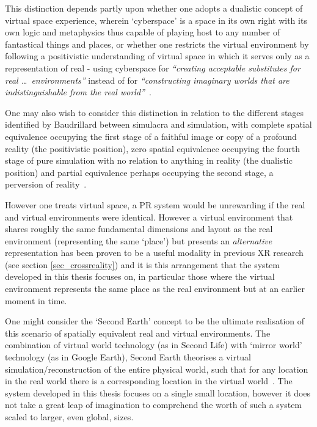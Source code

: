 This distinction depends partly upon whether one adopts a dualistic concept of virtual space experience, wherein `cyberspace' is a space in its own right with its own logic and metaphysics thus capable of playing host to any number of fantastical things and places, or whether one restricts the virtual environment by following a positivistic understanding of virtual space in which it serves only as a representation of real - using cyberspace for \textit{``creating acceptable substitutes for real \ldots\ environments''} instead of for \textit{``constructing imaginary worlds that are indistinguishable from the real world''}~\cite{Qvortrup2002}.

One may also wish to consider this distinction in relation to the different stages identified by Baudrillard between simulacra and simulation, with complete spatial equivalence occupying the first stage of a faithful image or copy of a profound reality (the positivistic position), zero spatial equivalence occupying the fourth stage of pure simulation with no relation to anything in reality (the dualistic position) and partial equivalence perhaps occupying the second stage, a perversion of reality~\cite{Baudrillard1994}.


However one treats virtual space, a PR system would be unrewarding if the real and virtual environments were identical\turklevrfootnote{}. However a virtual environment that shares roughly the same fundamental dimensions and layout as the real environment (representing the same `place') but presents an \textit{alternative} representation has been proven to be a useful modality in previous XR research (see section \ref{sec_crossreality}) and it is this arrangement that the system developed in this thesis focuses on, in particular those where the virtual environment represents the same place as the real environment but at an earlier moment in time.

One might consider the `Second Earth' concept to be the ultimate realisation of this scenario of spatially equivalent real and virtual environments. The combination of virtual world technology (as in Second Life) with `mirror world' technology (as in Google Earth), Second Earth theorises a virtual simulation/reconstruction of the entire physical world, such that for any location in the real world there is a corresponding location in the virtual world~\cite{Roush2007}. The system developed in this thesis focuses on a single small location, however it does not take a great leap of imagination to comprehend the worth of such a system scaled to larger, even global, sizes.

